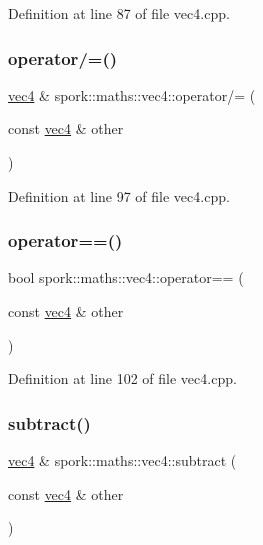 Definition at line 87 of file vec4.\+cpp.

\mbox{\label{structspork_1_1maths_1_1vec4_ae774d1b832150880f02e0ca313970589}} 
\subsubsection{\texorpdfstring{operator/=()}{operator/=()}}
{\footnotesize\ttfamily \hyperlink{structspork_1_1maths_1_1vec4}{vec4} \& spork\+::maths\+::vec4\+::operator/= (\begin{DoxyParamCaption}\item[{const \hyperlink{structspork_1_1maths_1_1vec4}{vec4} \&}]{other }\end{DoxyParamCaption})}



Definition at line 97 of file vec4.\+cpp.

\mbox{\label{structspork_1_1maths_1_1vec4_afbdaaf9efe13b03838fdac64c39220a6}} 
\subsubsection{\texorpdfstring{operator==()}{operator==()}}
{\footnotesize\ttfamily bool spork\+::maths\+::vec4\+::operator== (\begin{DoxyParamCaption}\item[{const \hyperlink{structspork_1_1maths_1_1vec4}{vec4} \&}]{other }\end{DoxyParamCaption})}



Definition at line 102 of file vec4.\+cpp.

\mbox{\label{structspork_1_1maths_1_1vec4_ae5955d13e2aaf8617aa98fbdbd0e7a75}} 
\subsubsection{\texorpdfstring{subtract()}{subtract()}}
{\footnotesize\ttfamily \hyperlink{structspork_1_1maths_1_1vec4}{vec4} \& spork\+::maths\+::vec4\+::subtract (\begin{DoxyParamCaption}\item[{const \hyperlink{structspork_1_1maths_1_1vec4}{vec4} \&}]{other }\end{DoxyParamCaption})}



